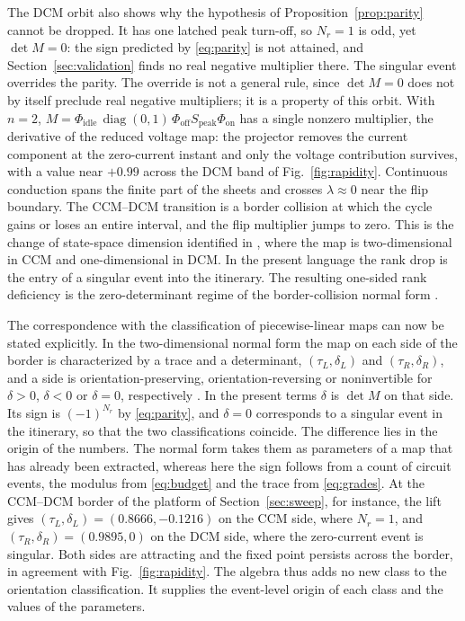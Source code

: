\documentclass[journal]{IEEEtran}
\begin{document}
The DCM orbit also shows why the hypothesis of Proposition~\ref{prop:parity}
cannot be dropped. It has one latched peak turn-off, so $N_r=1$ is odd, yet
$\det M=0$: the sign predicted by \eqref{eq:parity} is not attained, and
Section~\ref{sec:validation} finds no real negative multiplier there. The
singular event overrides the parity. The override is not a general rule,
since $\det M=0$ does not by itself preclude real negative multipliers; it
is a property of this orbit. With $n=2$,
$M=\Phi_{\mathrm{idle}}\,\operatorname{diag}(0,1)\,\Phi_{\mathrm{off}}
S_{\mathrm{peak}}\Phi_{\mathrm{on}}$ has a single nonzero multiplier, the
derivative of the reduced voltage map: the projector removes the current
component at the zero-current instant and only the voltage contribution
survives, with a value near $+0.99$ across the DCM band of
Fig.~\ref{fig:rapidity}. Continuous conduction spans the finite part of the
sheets and crosses $\lambda\approx 0$ near the flip boundary. The CCM--DCM
transition is a border collision at which the cycle gains or loses an entire
interval, and the flip multiplier jumps to zero. This is the change of state-space
dimension identified in \cite{parui2002border}, where the map is
two-dimensional in CCM and one-dimensional in DCM. In the present language
the rank drop is the entry of a singular event into the itinerary.
The resulting one-sided rank deficiency is the zero-determinant regime of
the border-collision normal form \cite{simpson2025zero,fatoyinbo2023synopsis}.

The correspondence with the classification of piecewise-linear maps can now
be stated explicitly. In the two-dimensional normal form the map on each
side of the border is characterized by a trace and a determinant,
$(\tau_L,\delta_L)$ and $(\tau_R,\delta_R)$, and a side is
orientation-preserving, orientation-reversing or noninvertible for
$\delta>0$, $\delta<0$ or $\delta=0$, respectively
\cite{ghosh2025robust,simpson2025zero}. In the present terms $\delta$ is
$\det M$ on that side. Its sign is $(-1)^{N_r}$ by \eqref{eq:parity}, and
$\delta=0$ corresponds to a singular event in the itinerary, so that the two
classifications coincide. The difference lies in the origin of the numbers.
The normal form takes them as parameters of a map that has already been
extracted, whereas here the sign follows from a count of circuit events, the
modulus from \eqref{eq:budget} and the trace from \eqref{eq:grades}. At the
CCM--DCM border of the platform of Section~\ref{sec:sweep}, for instance, the
lift gives $(\tau_L,\delta_L)=(0.8666,-0.1216)$ on the CCM side, where
$N_r=1$, and $(\tau_R,\delta_R)=(0.9895,0)$ on the DCM side, where the
zero-current event is singular. Both sides are attracting and the fixed
point persists across the border, in agreement with
Fig.~\ref{fig:rapidity}. The algebra thus adds no new class to the
orientation classification. It supplies the event-level origin of each
class and the values of the parameters.
\end{document}
